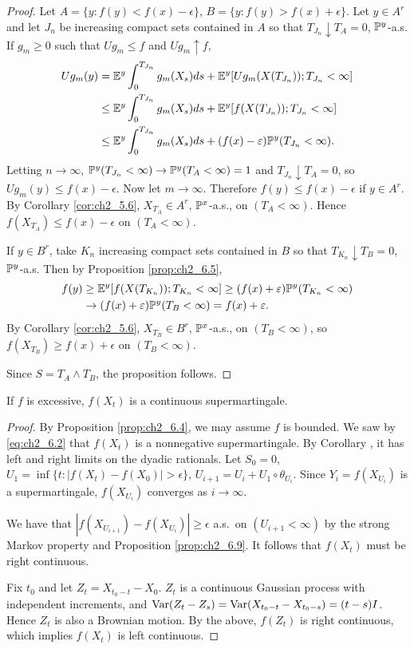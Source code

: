 \begin{proof}
Let $A = \{y : f(y) < f(x)-\epsilon\}$, $B = \{y : f(y) > f(x)+\epsilon\}$. Let $y \in A^r$ and let $J_n$ be increasing compact sets contained in $A$ so that $T_{J_n} \downarrow T_A = 0$, $\P^y$-a.s. If $g_m \geq 0$ such that $Ug_m \leq f$ and $Ug_m \uparrow f$,
\begin{align*}
    Ug_m(y) &= \E^y\int_0^{T_{J_n}} g_m(X_s)ds + \E^y[Ug_m(X(T_{J_n})); T_{J_n} < \infty] \\
    &\leq \E^y\int_0^{T_{J_n}} g_m(X_s)ds + \E^y[f(X(T_{J_n})); T_{J_n} < \infty] \\
    &\leq \E^y\int_0^{T_{J_n}} g_m(X_s)ds + (f(x)-\epsilon)\P^y(T_{J_n} < \infty).
\end{align*}
Letting $n \to \infty$, $\P^y(T_{J_n} < \infty) \to \P^y(T_A < \infty) = 1$ and $T_{J_n} \downarrow T_A = 0$, so $Ug_m(y) \leq f(x)-\epsilon$. Now let $m \to \infty$. Therefore $f(y) \leq f(x)-\epsilon$ if $y \in A^r$. By Corollary \ref{cor:ch2_5.6}, $X_{T_A} \in A^r$, $\P^x$-a.s., on $(T_A < \infty)$. Hence $f(X_{T_A}) \leq f(x)-\epsilon$ on $(T_A < \infty)$.

If $y \in B^r$, take $K_n$ increasing compact sets contained in $B$ so that $T_{K_n} \downarrow T_B = 0$, $\P^y$-a.s. Then by Proposition \ref{prop:ch2_6.5},
\begin{align*}
    f(y) &\geq \E^y[f(X(T_{K_n})); T_{K_n} < \infty] \geq (f(x)+\epsilon)\P^y(T_{K_n} < \infty) \\
    &\to (f(x)+\epsilon)\P^y(T_B < \infty) = f(x)+\epsilon.
\end{align*}
By Corollary \ref{cor:ch2_5.6}, $X_{T_B} \in B^r$, $\P^x$-a.s., on $(T_B < \infty)$, so $f(X_{T_B}) \geq f(x)+\epsilon$ on $(T_B < \infty)$.

Since $S = T_A \wedge T_B$, the proposition follows.
\end{proof}

\begin{theorem}\label{thm:ch2_6.10}
If $f$ is excessive, $f(X_t)$ is a continuous supermartingale.
\end{theorem}

\begin{proof}
By Proposition \ref{prop:ch2_6.4}, we may assume $f$ is bounded. We saw by \eqref{eq:ch2_6.2} that $f(X_t)$ is a nonnegative supermartingale. By Corollary , it has left and right limits on the dyadic rationals. Let $S_0 = 0$, $U_1 = \inf\{t : |f(X_t) - f(X_0)| > \epsilon\}$, $U_{i+1} = U_i + U_1 \circ \theta_{U_i}$. Since $Y_i = f(X_{U_i})$ is a supermartingale, $f(X_{U_i})$ converges as $i \to \infty$.

We have that $|f(X_{U_{i+1}}) - f(X_{U_i})| \geq \epsilon$ a.s.\ on $(U_{i+1} < \infty)$ by the strong Markov property and Proposition \ref{prop:ch2_6.9}. It follows that $f(X_t)$ must be right continuous.

Fix $t_0$ and let $Z_t = X_{t_0-t} - X_0$. $Z_t$ is a continuous Gaussian process with independent increments, and $\Var(Z_t - Z_s) = \Var(X_{t_0-t} - X_{t_0-s}) = (t-s)I$. Hence $Z_t$ is also a Brownian motion. By the above, $f(Z_t)$ is right continuous, which implies $f(X_t)$ is left continuous.
\end{proof}

